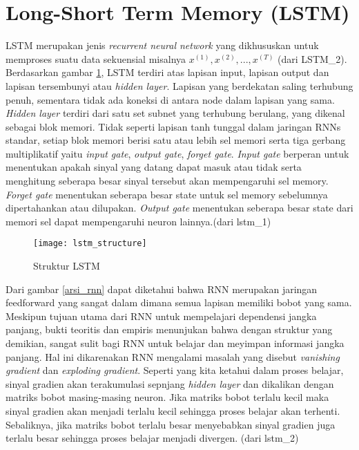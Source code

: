 \documentclass[../thesis.tex]{subfiles}
\begin{document}
\section{Long-Short Term Memory (LSTM)}
LSTM merupakan jenis \textit{recurrent neural network} yang dikhususkan untuk memproses suatu data sekuensial misalnya $x^{(1)}, x^{(2)}, ...,x^{(T)}$ (dari LSTM_2). 
Berdasarkan gambar \ref{arsi_lstm}, LSTM terdiri atas lapisan input, lapisan output dan lapisan tersembunyi atau \textit{hidden layer}. Lapisan yang berdekatan saling terhubung penuh, sementara tidak ada koneksi di antara node dalam lapisan yang sama.
\textit{Hidden layer} terdiri dari satu set subnet yang terhubung berulang, yang dikenal sebagai blok memori. Tidak seperti lapisan tanh tunggal dalam jaringan RNNs standar, setiap blok memori berisi satu atau lebih sel memori serta tiga gerbang multiplikatif
yaitu \textit{input gate}, \textit{output gate}, \textit{forget gate}. \textit{Input gate} berperan untuk menentukan apakah sinyal yang datang dapat masuk atau tidak serta menghitung seberapa besar sinyal tersebut akan mempengaruhi sel memory.
\textit{Forget gate} menentukan seberapa besar state untuk sel memory sebelumnya dipertahankan atau dilupakan. \textit{Output gate} menentukan seberapa besar state dari memori sel dapat mempengaruhi neuron lainnya.(dari lstm_1)

\begin{figure}
	\centering
	\texttt{[image: lstm\_structure]}
	\caption{Struktur LSTM}
	\label{arsi_lstm}
\end{figure}

Dari gambar \ref{arsi_rnn} dapat diketahui bahwa RNN merupakan jaringan feedforward yang sangat dalam dimana semua lapisan memiliki bobot yang sama. Meskipun tujuan utama dari RNN untuk mempelajari dependensi 
jangka panjang, bukti teoritis dan empiris menunjukan bahwa dengan struktur yang demikian, sangat sulit bagi RNN untuk belajar dan meyimpan informasi jangka panjang. Hal ini dikarenakan RNN mengalami masalah yang disebut 
\textit{vanishing gradient} dan \textit{exploding gradient}. Seperti yang kita ketahui dalam proses belajar, sinyal gradien akan terakumulasi sepnjang \textit{hidden layer} dan dikalikan dengan matriks bobot masing-masing neuron.
Jika matriks bobot terlalu kecil maka sinyal gradien akan menjadi terlalu kecil sehingga proses belajar akan terhenti. Sebaliknya, jika matriks bobot terlalu besar menyebabkan sinyal gradien juga terlalu besar sehingga proses belajar menjadi divergen. (dari lstm_2)
\end{document}
